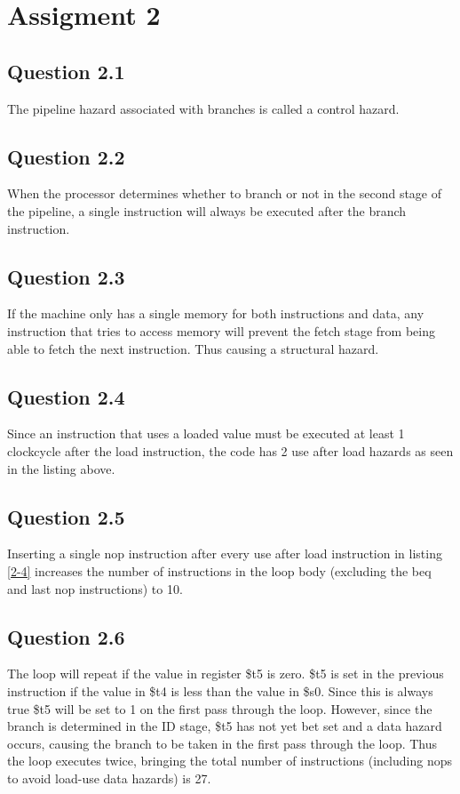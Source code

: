 \section{Assigment 2}
\subsection{Question 2.1}
The pipeline hazard associated with branches is called a control hazard.
\subsection{Question 2.2}
When the processor determines whether to branch or not in the second stage of the pipeline, a single instruction will always be
executed after the branch instruction.
\subsection{Question 2.3}
If the machine only has a single memory for both instructions and data, any instruction that tries to access memory will prevent
the fetch stage from being able to fetch the next instruction. Thus causing a structural hazard.

\subsection{Question 2.4}

Since an instruction that uses a loaded value must be executed at least 1 clockcycle after the load instruction, the code has
2 use after load hazards as seen in the listing above.

\subsection{Question 2.5}
Inserting a single nop instruction after every use after load instruction in listing \ref{2-4} increases the number of instructions
in the loop body (excluding the beq and last nop instructions) to 10.
\subsection{Question 2.6}
The loop will repeat if the value in register \$t5 is zero. \$t5 is set in the previous instruction if the value in \$t4 is less
than the value in \$s0. Since this is always true \$t5 will be set to 1 on the first pass through the loop. However, since the
branch is determined in the ID stage, \$t5 has not yet bet set and a data hazard occurs, causing the branch to be taken in the
first pass through the loop. Thus the loop executes twice, bringing the total number of instructions (including nops to avoid
load-use data hazards) is 27.
